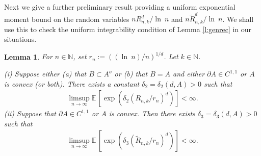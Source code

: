 \documentclass[12pt]{article}
\newcommand{\N}{\mathbb{N}}
\newcommand{\E}{\mathbb E \,}
\newcommand{\tR}{{\tilde{R}}}
\renewcommand{\log}{{\ln \:}}
\newtheorem{lemm}{Lemma}
\begin{document}
Next we give a further preliminary 
result providing a uniform exponential moment bound
on the random variables $nR_{n,k}^d/\log n$ and $n \tR_{n,k}^d/\log n$. 
We shall use this to check the uniform integrability condition of Lemma
\ref{l:genrec}
in our situations.


\begin{lemm}
\label{meanlem}
	For $n \in \N$, set $r_n:= ((\log n)/ n )^{1/d}   $.
	Let $k \in \mathbb N$. 

	(i) Suppose  either (a) that
	$B \subset A^o$  or (b) that 
	$B=A$ and either $\partial A \in C^{1,1}$ or $A$ is convex (or both). 
	There exists a constant $\delta_2 = \delta_2(d,A) >0$ such that
	\begin{align}
	\limsup_{n \to \infty} \E[ \exp(\delta_2  (R_{n,k}/r_n)^d)] < \infty.
\label{eqmeanlem}
	\end{align}
	(ii) Suppose that  $\partial A \in C^{1,1}$ or $A$ is convex.
	Then there exists $\delta_3 = \delta_3(d,A) > 0$ such that 
	\begin{align}
	\limsup_{n \to \infty} \E[ \exp(\delta_3  (\tR_{n,k}/r_n)^d)] < \infty.
\label{eqmeanlem2}
	\end{align}
\end{lemm}
\end{document}
